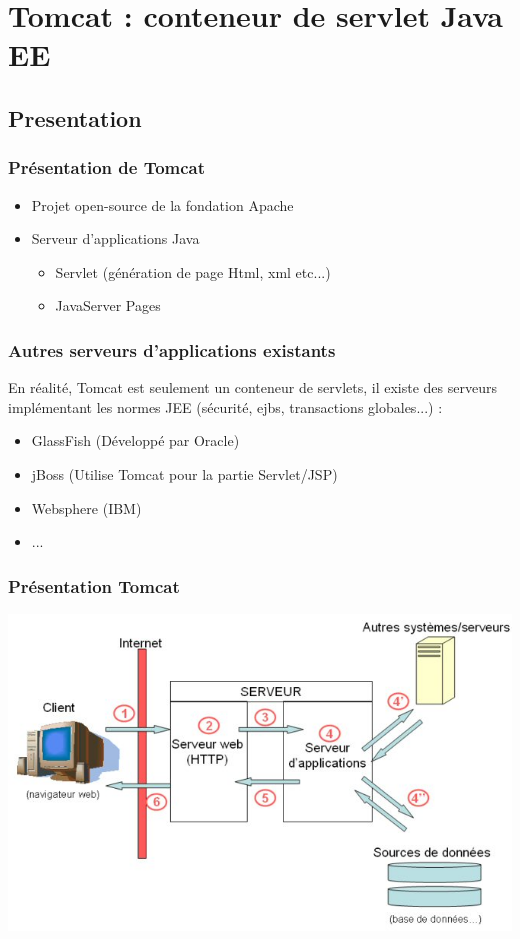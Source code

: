 \section{Tomcat : conteneur de servlet Java EE}
\subsection{Presentation}
\begin{frame}
  \frametitle{Présentation de Tomcat}

  \begin{itemize}
    \item Projet open-source de la fondation Apache
    \item Serveur d'applications Java
    \begin{itemize}
      \item Servlet (génération de page Html, xml etc...)
      \item JavaServer Pages
    \end{itemize}
  \end{itemize}
\end{frame}

\begin{frame}
  \frametitle{Autres serveurs d'applications existants}
En réalité, Tomcat est seulement un conteneur de servlets, il existe des serveurs implémentant les normes JEE (sécurité, ejbs, transactions globales...) :
\begin{itemize} 
  \item GlassFish (Développé par Oracle)
  \item jBoss (Utilise Tomcat pour la partie Servlet/JSP)
  \item Websphere (IBM)
  \item ...
\end{itemize}
\end{frame}

\begin{frame}
  \frametitle{Présentation Tomcat}
  \includegraphics[scale=0.5]{Images/serveurapp.png}
\end{frame}

